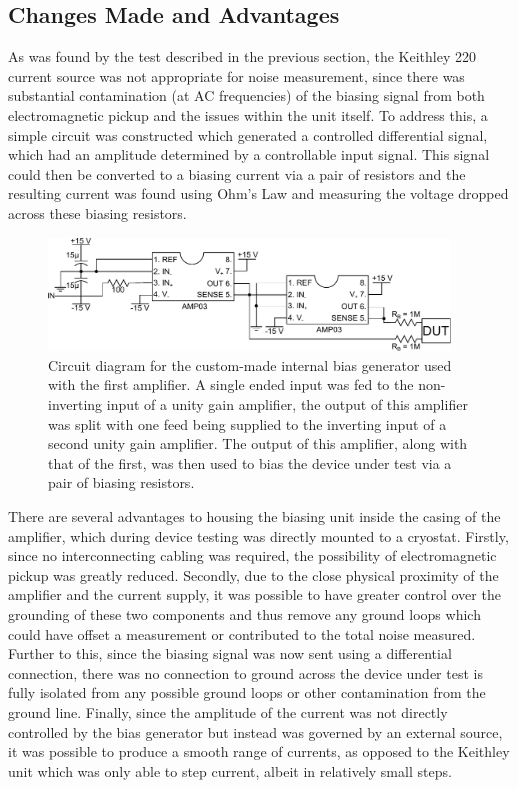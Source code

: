\subsection{Changes Made and Advantages} \label{ssec:RTD_bias_changes&advantages}
As was found by the test described in the previous section, the Keithley 220 current source was not appropriate for noise measurement, since there was substantial contamination (at AC frequencies) of the biasing signal from both electromagnetic pickup and the issues within the unit itself. To address this, a simple circuit was constructed which generated a controlled differential signal, which had an amplitude determined by a controllable input signal. This signal could then be converted to a biasing current via a pair of resistors and the resulting current was found using Ohm's Law and measuring the voltage dropped across these biasing resistors.
\begin{figure}[t]
\begin{center}
\includegraphics[width = 0.95\textwidth]{figures/RTD_bias}
\caption[Internal bias generator used with initial amplifier]{Circuit diagram for the custom-made internal bias generator used with the first amplifier. A single ended input was fed to the non-inverting input of a unity gain amplifier, the output of this amplifier was split with one feed being supplied to the inverting input of a second unity gain amplifier. The output of this amplifier, along with that of the first, was then used to bias the device under test via a pair of biasing resistors.}
\label{fig:RTD_bias}
\end{center}
\end{figure}
\par 
There are several advantages to housing the biasing unit inside the casing of the amplifier, which during device testing was directly mounted to a cryostat. Firstly, since no interconnecting cabling was required, the possibility of electromagnetic pickup was greatly reduced. Secondly, due to the close physical proximity of the amplifier and the current supply, it was possible to have greater control over the grounding of these two components and thus remove any ground loops which could have offset a measurement or contributed to the total noise measured. Further to this, since the biasing signal was now sent using a differential connection, there was no connection to ground across the device under test is fully isolated from any possible ground loops or other contamination from the ground line. Finally, since the amplitude of the current was not directly controlled by the bias generator but instead was governed by an external source, it was possible to produce a smooth range of currents, as opposed to the Keithley unit which was only able to step current, albeit in relatively small steps.
